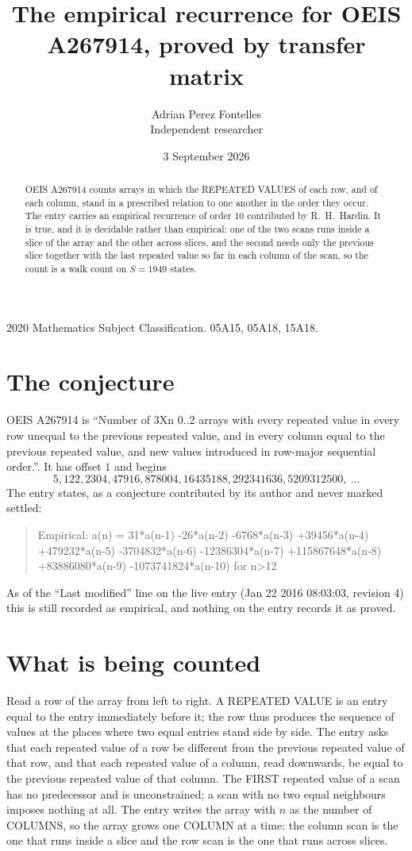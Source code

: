\documentclass[11pt,a4paper]{article}
\title{The empirical recurrence for OEIS A267914, proved by transfer matrix}
\author{Adrian Perez Fontelles\\ \small Independent researcher}
\date{3 September 2026}
\theoremstyle{plain}
\theoremstyle{definition}
\begin{document}
\maketitle

\begin{abstract}
OEIS A267914 counts arrays in which the REPEATED VALUES of each row, and of each column, stand in a
prescribed relation to one another in the order they occur. The entry carries an empirical
recurrence of order $10$ contributed by R.~H.~Hardin. It is true, and it is decidable
rather than empirical: one of the two scans runs inside a slice of the array and the other
across slices, and the second needs only the previous slice together with the last repeated
value so far in each column of the scan, so the count is a walk count on $S=1949$ states.
\end{abstract}

\noindent\small 2020 Mathematics Subject Classification. 05A15, 05A18, 15A18.\normalsize

\section{The conjecture}

OEIS A267914 is ``Number of 3Xn 0..2 arrays with every repeated value in every row unequal to the previous repeated value, and in every column equal to the previous repeated value, and new values introduced in row-major sequential order.''. It has offset $1$ and begins
\[
5, 122, 2304, 47916, 878004, 16435188, 292341636, 5209312500,\ \dots
\]
The entry states, as a conjecture contributed by its author and never marked settled:
\begin{quote}
Empirical: a(n) = 31*a(n-1) -26*a(n-2) -6768*a(n-3) +39456*a(n-4) +479232*a(n-5) -3704832*a(n-6) -12386304*a(n-7) +115867648*a(n-8) +83886080*a(n-9) -1073741824*a(n-10) for n>12
\end{quote}
As of the ``Last modified'' line on the live entry (Jan 22 2016 08:03:03, revision 4) this is still
recorded as empirical, and nothing on the entry records it as proved.

\section{What is being counted}

Read a row of the array from left to right. A REPEATED VALUE is an entry equal to the entry
immediately before it; the row thus produces the sequence of values at the places where two
equal entries stand side by side. The entry asks that each repeated value of a row be
different from the previous repeated value of that row, and that each repeated value of a column,
read downwards, be equal to the previous repeated value of that column. The FIRST repeated
value of a scan has no predecessor and is unconstrained; a scan with no two equal neighbours
imposes nothing at all. The entry writes the array with $n$ as the number of COLUMNS, so the array grows one COLUMN at a time: the column scan is the one that runs inside a slice and the row scan is the one that runs across slices.
\end{document}
